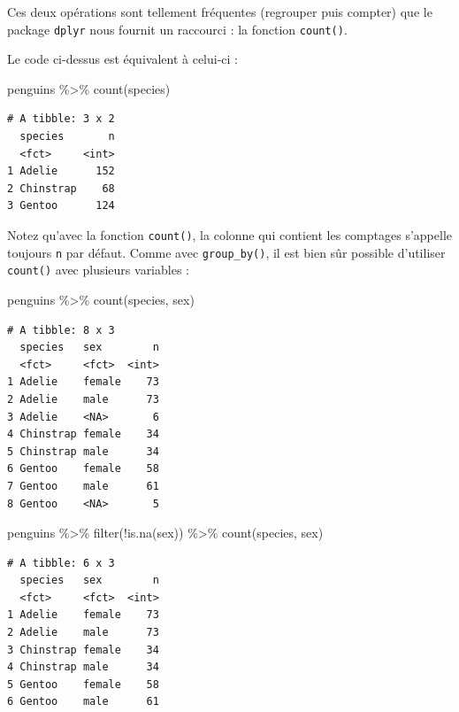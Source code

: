 \documentclass[
  a4paper,
  DIV=11,
  numbers=noendperiod,
  oneside]{scrreprt}
\newenvironment{Shaded}{}{}
\newcommand{\FunctionTok}[1]{\textcolor[rgb]{0.44,0.26,0.76}{#1}}
\newcommand{\NormalTok}[1]{\textcolor[rgb]{0.14,0.16,0.18}{#1}}
\newcommand{\SpecialCharTok}[1]{\textcolor[rgb]{0.00,0.36,0.77}{#1}}
\begin{document}
Ces deux opérations sont tellement fréquentes (regrouper puis compter)
que le package \texttt{dplyr} nous fournit un raccourci : la fonction
\texttt{count()}.

Le code ci-dessus est équivalent à celui-ci :

\begin{Shaded}
\begin{Highlighting}[]
\NormalTok{penguins }\SpecialCharTok{\%\textgreater{}\%} 
  \FunctionTok{count}\NormalTok{(species)}
\end{Highlighting}
\end{Shaded}

\begin{verbatim}
# A tibble: 3 x 2
  species       n
  <fct>     <int>
1 Adelie      152
2 Chinstrap    68
3 Gentoo      124
\end{verbatim}

Notez qu'avec la fonction \texttt{count()}, la colonne qui contient les
comptages s'appelle toujours \texttt{n} par défaut. Comme avec
\texttt{group\_by()}, il est bien sûr possible d'utiliser
\texttt{count()} avec plusieurs variables :

\begin{Shaded}
\begin{Highlighting}[]
\NormalTok{penguins }\SpecialCharTok{\%\textgreater{}\%} 
  \FunctionTok{count}\NormalTok{(species, sex)}
\end{Highlighting}
\end{Shaded}

\begin{verbatim}
# A tibble: 8 x 3
  species   sex        n
  <fct>     <fct>  <int>
1 Adelie    female    73
2 Adelie    male      73
3 Adelie    <NA>       6
4 Chinstrap female    34
5 Chinstrap male      34
6 Gentoo    female    58
7 Gentoo    male      61
8 Gentoo    <NA>       5
\end{verbatim}

\begin{Shaded}
\begin{Highlighting}[]
\NormalTok{penguins }\SpecialCharTok{\%\textgreater{}\%} 
  \FunctionTok{filter}\NormalTok{(}\SpecialCharTok{!}\FunctionTok{is.na}\NormalTok{(sex)) }\SpecialCharTok{\%\textgreater{}\%} 
  \FunctionTok{count}\NormalTok{(species, sex)}
\end{Highlighting}
\end{Shaded}

\begin{verbatim}
# A tibble: 6 x 3
  species   sex        n
  <fct>     <fct>  <int>
1 Adelie    female    73
2 Adelie    male      73
3 Chinstrap female    34
4 Chinstrap male      34
5 Gentoo    female    58
6 Gentoo    male      61
\end{verbatim}
\end{document}
